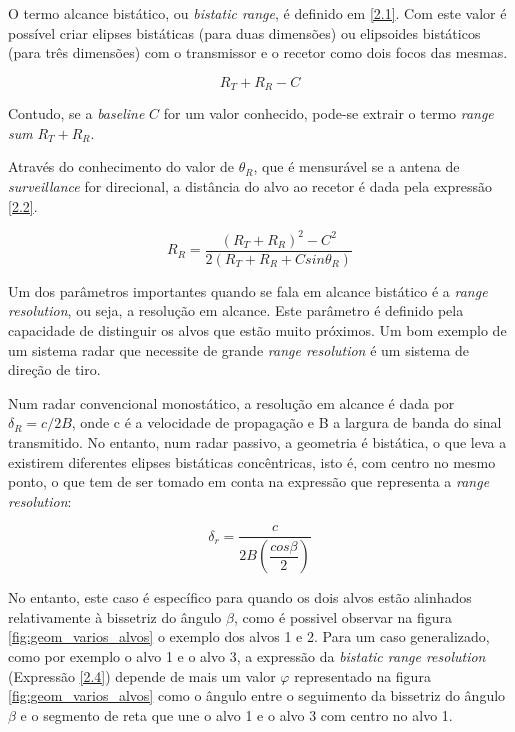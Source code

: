 O termo alcance bistático, ou \textit{bistatic range}, é definido em \ref{2.1}. Com este valor é possível criar elipses bistáticas (para duas dimensões) ou elipsoides bistáticos (para três dimensões) com o transmissor e o recetor como dois focos das mesmas. \par

\begin{equation} \label{2.1}
R_{T}+R_{R}-C
\end{equation}

Contudo, se a \textit{baseline} $C$ for um valor conhecido, pode-se extrair o termo \textit{range sum} $R_{T}+R_{R}$. \par
Através do conhecimento do valor de $\theta_{R}$, que é mensurável se a antena de \textit{surveillance} for direcional, a distância do alvo ao recetor é dada pela expressão \ref{2.2}.

\begin{equation} \label{2.2}
R_{R}=\dfrac{\left(  R_{T}+R_{R}\right)^{2}-C^{2}}{2\left(  R_{T}+R_{R}+C sin\theta_{R}\right)}
\end{equation}


Um dos parâmetros importantes quando se fala em alcance bistático é a \textit{range resolution}, ou seja, a resolução em alcance. Este parâmetro é definido pela capacidade de distinguir os alvos que estão muito próximos. Um bom exemplo de um sistema radar que necessite de grande \textit{range resolution} é um sistema de direção de tiro. \par 

Num radar convencional monostático, a resolução em alcance é dada por $\delta_{R}=c/2B$, onde c é a velocidade de propagação e B a largura de banda do sinal transmitido. No entanto, num radar passivo, a geometria é bistática, o que leva a existirem diferentes elipses bistáticas concêntricas, isto é, com centro no mesmo ponto, o que tem de ser tomado em conta na expressão que representa a \textit{range resolution}:

\begin{equation} \label{2.3}
\delta_{r}=\dfrac{c}{2B\left( \dfrac{cos\beta}{2}\right)}
\end{equation}

No entanto, este caso é específico para quando os dois alvos estão alinhados relativamente à bissetriz do ângulo $\beta$, como é possivel observar na figura \ref{fig:geom_varios_alvos} o exemplo dos alvos 1 e 2. Para um caso generalizado, como por exemplo o alvo 1 e o alvo 3, a expressão da \textit{bistatic range resolution} (Expressão \ref{2.4}) depende de mais um valor $\varphi$ representado na figura \ref{fig:geom_varios_alvos} como o ângulo entre o seguimento da bissetriz do ângulo $\beta$ e o segmento de reta que une o alvo 1 e o alvo 3 com centro no alvo 1. 

